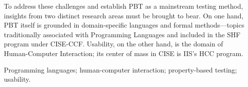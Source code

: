

To address these challenges and establish PBT as a mainstream
testing method, insights from two distinct research areas must be
brought to bear.
On one hand, PBT itself is grounded in domain-specific languages and
formal methods---topics traditionally associated with Programming
Languages and included in the SHF
program under CISE-CCF.  Usability, on the other hand, is the domain
of Human-Computer Interaction; its center of mass in CISE is IIS's
HCC program.

\smallskip

 Programming languages; human-computer
interaction; property-based testing; usability.

